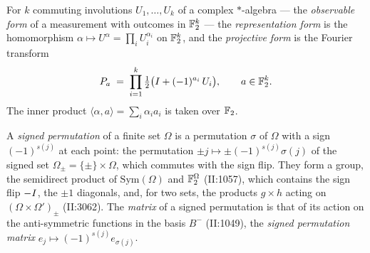 \begin{definition}
\label{def:fourier-forms}
\leanok
For $k$ commuting involutions $U_1, \dots, U_k$ of a complex $\ast$-algebra --- the
\emph{observable form} of a measurement with outcomes in $\mathbb{F}_2^k$ --- the \emph{representation
form} is the homomorphism $\alpha \mapsto U^\alpha = \prod_i U_i^{\alpha_i}$ on $\mathbb{F}_2^k$, and the
\emph{projective form} is the Fourier transform
\[
  P_a \;=\; \prod_{i=1}^{k} \tfrac12\bigl(I + (-1)^{a_i}\, U_i\bigr), \qquad a \in \mathbb{F}_2^k.
\]
The inner product $\langle \alpha, a\rangle = \sum_i \alpha_i a_i$ is taken over $\mathbb{F}_2$.
\end{definition}

\begin{definition}
\label{def:signed-perm}
\leanok
A \emph{signed permutation} of a finite set $\Omega$ is a permutation $\sigma$ of $\Omega$ with a
sign $(-1)^{s(j)}$ at each point: the permutation $\pm j \mapsto \pm (-1)^{s(j)} \sigma(j)$ of the
signed set $\Omega_\pm = \{\pm\} \times \Omega$, which commutes with the sign flip. They form a
group, the semidirect product of $\mathrm{Sym}(\Omega)$ and $\mathbb{F}_2^\Omega$ (II:1057), which
contains the sign flip $-I$, the $\pm 1$ diagonals, and, for two sets, the products
$g \times h$ acting on $(\Omega \times \Omega')_\pm$ (II:3062). The \emph{matrix} of a signed
permutation is that of its action on the anti-symmetric functions in the basis $B^-$ (II:1049),
the \emph{signed permutation matrix} $e_j \mapsto (-1)^{s(j)} e_{\sigma(j)}$.
\end{definition}

